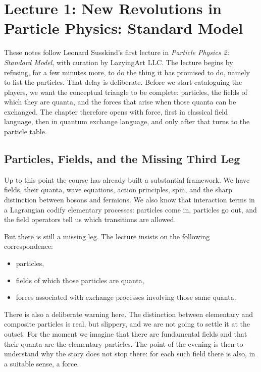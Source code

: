 \chapter{Lecture 1: New Revolutions in Particle Physics: Standard Model}

These notes follow Leonard Susskind's first lecture in \emph{Particle Physics 2: Standard Model}, with curation by LazyingArt LLC. The lecture begins by refusing, for a few minutes more, to do the thing it has promised to do, namely to list the particles. That delay is deliberate. Before we start cataloguing the players, we want the conceptual triangle to be complete: particles, the fields of which they are quanta, and the forces that arise when those quanta can be exchanged. The chapter therefore opens with force, first in classical field language, then in quantum exchange language, and only after that turns to the particle table.

\section{Particles, Fields, and the Missing Third Leg}

Up to this point the course has already built a substantial framework. We have fields, their quanta, wave equations, action principles, spin, and the sharp distinction between bosons and fermions. We also know that interaction terms in a Lagrangian codify elementary processes: particles come in, particles go out, and the field operators tell us which transitions are allowed.

But there is still a missing leg. The lecture insists on the following correspondence:
\begin{itemize}
\item particles,
\item fields of which those particles are quanta,
\item forces associated with exchange processes involving those same quanta.
\end{itemize}

There is also a deliberate warning here. The distinction between elementary and composite particles is real, but slippery, and we are not going to settle it at the outset. For the moment we imagine that there are fundamental fields and that their quanta are the elementary particles. The point of the evening is then to understand why the story does not stop there: for each such field there is also, in a suitable sense, a force.

